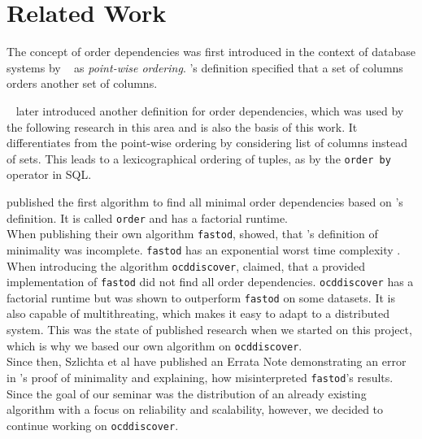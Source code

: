 
\section{Related Work}\label{sec:related_work}
  The concept of order dependencies was first introduced in the context of database systems by \citeauthor{ginsburg}~\cite{ginsburg} as \textit{point-wise ordering}.
  \citeauthor{ginsburg}'s definition specified that a set of columns orders another set of columns.

  \citeauthor{szlichta:fundamentals}~\cite{szlichta:fundamentals} later introduced another definition for order dependencies, which was used by the following research in this area \cite{consonni, langer, szlichta:discovery} and is also the basis of this work.
  It differentiates from the point-wise ordering by considering list of columns instead of sets.
  This leads to a lexicographical ordering of tuples, as by the \texttt{order by} operator in SQL.

\citeauthor{langer} published the first algorithm to find all minimal order dependencies based on \citeauthor{szlichta:fundamentals}'s definition. 
It is called \texttt{order} and has a factorial runtime.\\
When publishing their own algorithm \texttt{fastod}, \citeauthor{szlichta:discovery} showed, that \citeauthor{langer}'s definition of minimality was incomplete. 
\texttt{fastod} has an exponential worst time complexity \citep{szlichta:discovery}.\\
When introducing the algorithm \texttt{ocddiscover}, \citeauthor{consonni} claimed, that a provided implementation of \texttt{fastod} did not find all order dependencies. 
\texttt{ocddiscover} has a factorial runtime but was shown to outperform \texttt{fastod} on some datasets. 
It is also capable of multithreating, which makes it easy to adapt to a distributed system.
This was the state of published research when we started on this project, which is why we based our own algorithm on \texttt{ocddiscover}. \\
Since then, Szlichta et al have published an Errata Note demonstrating an error in \citeauthor{consonni}'s proof of minimality and explaining, how \citeauthor{consonni} misinterpreted \texttt{fastod}'s results.
Since the goal of our seminar was the distribution of an already existing algorithm with a focus on reliability and scalability, however, we decided to continue working on \texttt{ocddiscover}.
